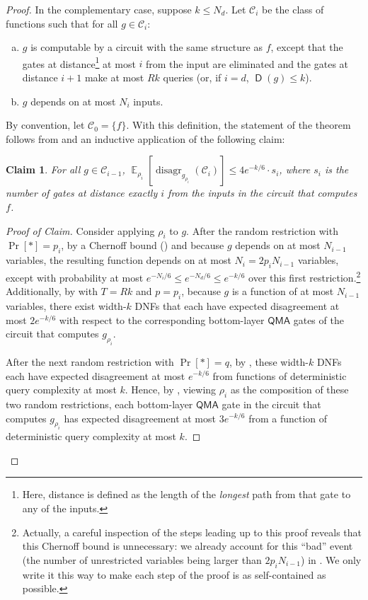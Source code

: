\documentclass[10pt,a4paper]{article}
\newtheorem{claim}[theorem]{Claim}
\newcommand{\E}{\mathop{\mathbb{E}}}
\DeclareMathOperator{\disagr}{\mathrm{disagr}}
\DeclareMathOperator{\D}{\mathsf{D}}
\begin{document}
\begin{proof}
In the complementary case, suppose $k \le N_d$. Let $\mathcal{C}_i$ be the class of functions such that for all $g \in \mathcal{C}_i$:
\begin{enumerate}[(a)]
\item $g$ is computable by a circuit with the same structure as $f$, except that the gates at distance\footnote{Here, distance is defined as the length of the \textit{longest} path from that gate to any of the inputs.} at most $i$ from the input are eliminated and the gates at distance $i + 1$ make at most $Rk$ queries (or, if $i = d$, $\D(g) \le k$).
\item $g$ depends on at most $N_i$ inputs.
\end{enumerate}
By convention, let $\mathcal{C}_0 = \{f\}$. With this definition, the statement of the theorem follows from  and an inductive application of the following claim:
\begin{claim}
For all $g \in \mathcal{C}_{i-1}$, $\E_{\rho_i}\left[\disagr_{g_{\rho_i}}\left(\mathcal{C}_i\right)\right] \le 4e^{-k/6} \cdot s_i$, where $s_i$ is the number of gates at distance exactly $i$ from the inputs in the circuit that computes $f$.
\end{claim}
\begin{proof}[Proof of Claim]
Consider applying $\rho_i$ to $g$. After the random restriction with $\Pr[*] = p_i$, by a Chernoff bound () and because $g$ depends on at most $N_{i-1}$ variables, the resulting function depends on at most $N_i = 2p_iN_{i-1}$ variables, except with probability at most $e^{-N_i / 6} \le e^{-N_d / 6} \le e^{-k/6}$ over this first restriction.\footnote{Actually, a careful inspection of the steps leading up to this proof reveals that this Chernoff bound is unnecessary: we already account for this ``bad'' event (the number of unrestricted variables being larger than $2p_i N_{i-1}$) in . We only write it this way to make each step of the proof is as self-contained as possible.} Additionally, by  with $T = Rk$ and $p = p_i$, because $g$ is a function of at most $N_{i-1}$ variables, there exist width-$k$ DNFs that each have expected disagreement at most $2e^{-k/6}$ with respect to the corresponding bottom-layer $\mathsf{QMA}$ gates of the circuit that computes $g_{\rho_i}$.

After the next random restriction with $\Pr[*] = q$, by , these width-$k$ DNFs each have expected disagreement at most $e^{-k/6}$ from functions of deterministic query complexity at most $k$. Hence, by , viewing $\rho_i$ as the composition of these two random restrictions, each bottom-layer $\mathsf{QMA}$ gate in the circuit that computes $g_{\rho_i}$ has expected disagreement at most $3e^{-k/6}$ from a function of deterministic query complexity at most $k$.


\end{proof}
\end{proof}
\end{document}
